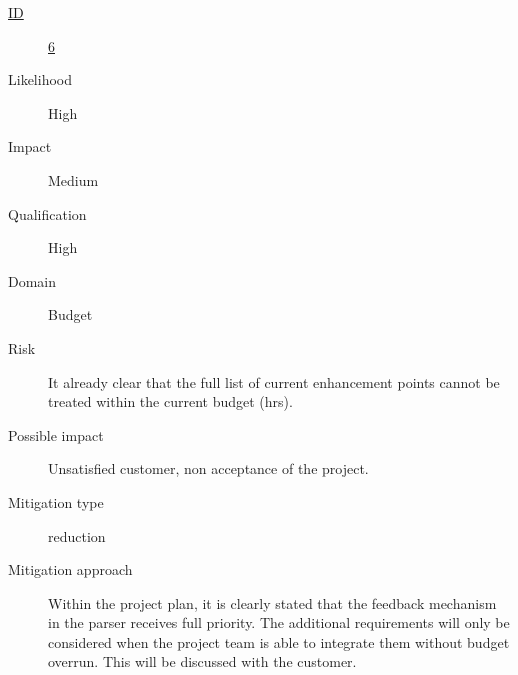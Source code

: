 \begin{description}
	\item [\underline{ID}]
	\underline{6}
	\item[Likelihood]
	High
	\item[Impact]
	Medium
	\item[Qualification]
	High
	\item[Domain]
	Budget
	\item[Risk]
	It already clear that the full list of current enhancement points cannot be treated within the current budget (hrs).
	\item[Possible impact]
	Unsatisfied customer, non acceptance of the project.
	\item[Mitigation type]
	reduction
	\item[Mitigation approach]
	Within the project plan, it is clearly stated that the feedback mechanism in the parser receives full priority. 
	The additional requirements will only be considered when the project team is able to integrate them without budget overrun. 
	This will be discussed with the customer.
\end {description}

